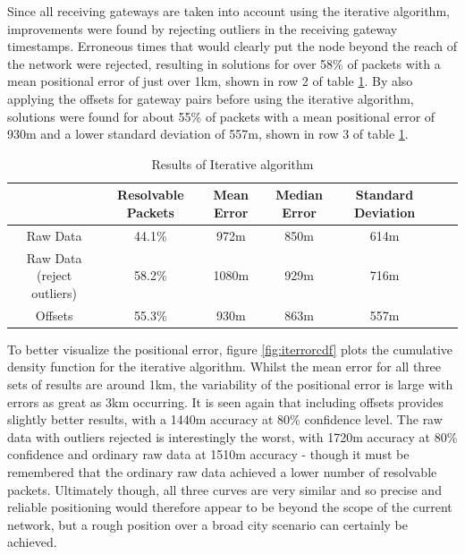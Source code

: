 \documentclass[a4paper]{report}
\begin{document}
    Since all receiving gateways are taken into account using the iterative algorithm, improvements were found by rejecting outliers in the receiving gateway timestamps. Erroneous times that would clearly put the node beyond the reach of the network were rejected, resulting in solutions for over 58\% of packets with a mean positional error of just over 1km, shown in row 2 of table \ref{tab:iterresults}. By also applying the offsets for gateway pairs before using the iterative algorithm, solutions were found for about 55\% of packets with a mean positional error of 930m and a lower standard deviation of 557m, shown in row 3 of table \ref{tab:iterresults}.

    \begin{table}[ht]
      \begin{center}
        \caption{Results of Iterative algorithm}
        \label{tab:iterresults}
        \begin{tabular}{|c|c|c|c|c|c|c|}
          \hline
           & Resolvable Packets & Mean Error & Median Error & Standard Deviation \\
          \hline
          Raw Data & 44.1\% & 972m & 850m & 614m \\
          \hline
          Raw Data (reject outliers) & 58.2\% & 1080m & 929m & 716m \\
          \hline
          Offsets & 55.3\% & 930m & 863m & 557m \\
          \hline
        \end{tabular}
      \end{center}
    \end{table}

    To better visualize the positional error, figure \ref{fig:iterrorcdf} plots the cumulative density function for the iterative algorithm. Whilst the mean error for all three sets of results are around 1km, the variability of the positional error is large with errors as great as 3km occurring. It is seen again that including offsets provides slightly better results, with a 1440m accuracy at 80\% confidence level. The raw data with outliers rejected is interestingly the worst, with 1720m accuracy at 80\% confidence and ordinary raw data at 1510m accuracy - though it must be remembered that the ordinary raw data achieved a lower number of resolvable packets. Ultimately though, all three curves are very similar and so precise and reliable positioning would therefore appear to be beyond the scope of the current network, but a rough position over a broad city scenario can certainly be achieved.
\end{document}

